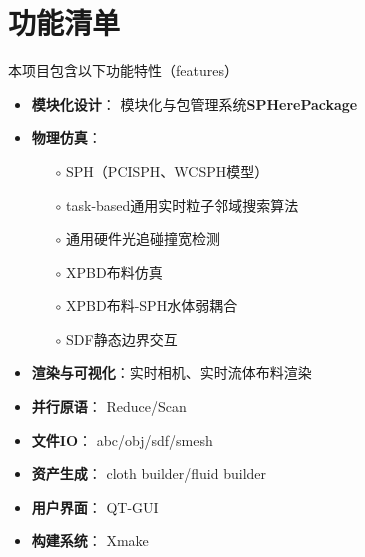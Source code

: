 \section{功能清单}
本项目包含以下功能特性（features）
\begin{itemize}
	\item \textbf{模块化设计}： 模块化与包管理系统\textbf{SPHerePackage}
	\item \textbf{物理仿真}：
	      \begin{itemize}
		      \item[$\circ$]SPH（PCISPH、WCSPH模型）
		      \item[$\circ$]task-based通用实时粒子邻域搜索算法
		      \item[$\circ$]通用硬件光追碰撞宽检测
		      \item[$\circ$]XPBD布料仿真
		      \item[$\circ$]XPBD布料-SPH水体弱耦合
		      \item[$\circ$]SDF静态边界交互
	      \end{itemize}
	\item \textbf{渲染与可视化}：实时相机、实时流体布料渲染
	\item \textbf{并行原语}： Reduce/Scan
	\item \textbf{文件IO}： abc/obj/sdf/smesh
	\item \textbf{资产生成}： cloth builder/fluid builder
	\item \textbf{用户界面}： QT-GUI
	\item \textbf{构建系统}： Xmake
\end{itemize}